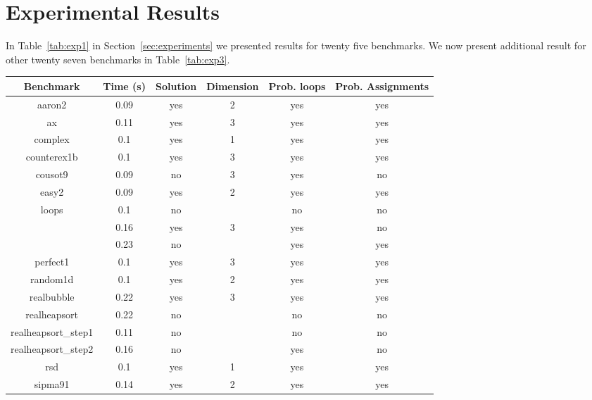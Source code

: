 
\section{Experimental Results}\label{sec:app_ex}
In Table~\ref{tab:exp1} in Section~\ref{sec:experiments} we presented results for twenty five benchmarks.
We now present additional result for other twenty seven benchmarks in Table~\ref{tab:exp3}.



\begin{center}
\begin{table}[]
  \centering
   \begin{tabular}{c|c|c|c|c|c}
    
{Benchmark} & {Time (s)} & {Solution} & {Dimension} & {Prob. loops} & {Prob. Assignments} \\\hline \hline
{aaron2} & {0.09} & {yes} & {2} & {yes} & {yes} \\\hline
{ax} & {0.11} & {yes} & {3} & {yes} & {yes} \\\hline
{complex} & {0.1} & {yes} & {1} & {yes} & {yes} \\\hline
{counterex1b} & {0.1} & {yes} & {3} & {yes} & {yes} \\\hline
{cousot9} & {0.09} & {no} & {3} & {yes} & {no} \\\hline
{easy2} & {0.09} & {yes} & {2} & {yes} & {yes} \\\hline
{loops} & {0.1} & {no} & {} & {no} & {no} \\\hline
{\multirow{2}{*}{nestedloop}} & {0.16} & {yes} & {3} & {yes} & {no} \\\cline{2-6}
{} & {0.23} & {no} & {} & {yes} & {yes} \\\hline
{perfect1} & {0.1} & {yes} & {3} & {yes} & {yes} \\\hline
{random1d} & {0.1} & {yes} & {2} & {yes} & {yes} \\\hline
{realbubble} & {0.22} & {yes} & {3} & {yes} & {yes} \\\hline
{realheapsort} & {0.22} & {no} & {} & {no} & {no} \\\hline
{realheapsort\_step1} & {0.11} & {no} & {} & {no} & {no} \\\hline
{realheapsort\_step2} & {0.16} & {no} & {} & {yes} & {no} \\\hline
{rsd} & {0.1} & {yes} & {1} & {yes} & {yes} \\\hline
{sipma91} & {0.14} & {yes} & {2} & {yes} & {yes} \\\hline

\end{tabular}
\end{table}
\end{center}

